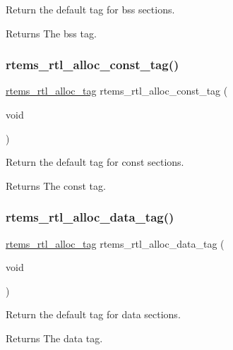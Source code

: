 Return the default tag for bss sections.

\begin{DoxyReturn}{Returns}
The bss tag. 
\end{DoxyReturn}
\mbox{\label{rtl-allocator_8c_ac94530ff626eb651e97d142b635e161e}} 
\subsubsection{\texorpdfstring{rtems\_rtl\_alloc\_const\_tag()}{rtems\_rtl\_alloc\_const\_tag()}}
{\footnotesize\ttfamily \mbox{\hyperlink{rtl-allocator_8h_a445a8615118b7fc14005ab20583153fd}{rtems\+\_\+rtl\+\_\+alloc\+\_\+tag}} rtems\+\_\+rtl\+\_\+alloc\+\_\+const\+\_\+tag (\begin{DoxyParamCaption}\item[{void}]{ }\end{DoxyParamCaption})}

Return the default tag for const sections.

\begin{DoxyReturn}{Returns}
The const tag. 
\end{DoxyReturn}
\mbox{\label{rtl-allocator_8c_aac71a304eb90c1c400a3c5113506219a}} 
\subsubsection{\texorpdfstring{rtems\_rtl\_alloc\_data\_tag()}{rtems\_rtl\_alloc\_data\_tag()}}
{\footnotesize\ttfamily \mbox{\hyperlink{rtl-allocator_8h_a445a8615118b7fc14005ab20583153fd}{rtems\+\_\+rtl\+\_\+alloc\+\_\+tag}} rtems\+\_\+rtl\+\_\+alloc\+\_\+data\+\_\+tag (\begin{DoxyParamCaption}\item[{void}]{ }\end{DoxyParamCaption})}

Return the default tag for data sections.

\begin{DoxyReturn}{Returns}
The data tag. 
\end{DoxyReturn}
\mbox{\label{rtl-allocator_8c_a53995705cd080120f3755af859d7cc50}} 
